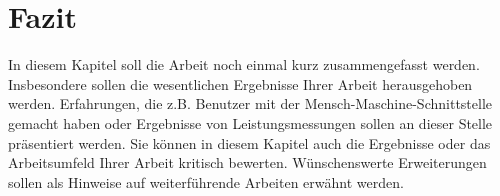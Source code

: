 \chapter{Fazit}

In diesem Kapitel soll die Arbeit noch einmal kurz zusammengefasst werden. Insbesondere sollen die wesentlichen Ergebnisse Ihrer Arbeit herausgehoben werden. Erfahrungen, die z.B. Benutzer mit der Mensch-Maschine-Schnittstelle gemacht haben oder Ergebnisse von Leistungsmessungen sollen an dieser Stelle präsentiert werden. Sie können in diesem Kapitel auch die Ergebnisse oder das Arbeitsumfeld Ihrer Arbeit kritisch bewerten. Wünschenswerte Erweiterungen sollen als Hinweise auf weiterführende Arbeiten erwähnt werden.
